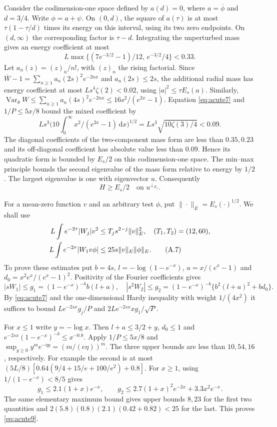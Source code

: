 \documentclass[11pt,a4paper,reqno]{amsart}
\theoremstyle{remark}
\numberwithin{equation}{section}
\newcommand{\dd}{\,\mathrm d}
\newcommand{\av}[1]{\overline{#1}}
\DeclareMathOperator{\Var}{Var}
\begin{document}
Consider the codimension-one space defined by $a(d)=0$, where
$a=\av\phi$ and $d=3/4$. Write $\phi=a+\psi$. On $(0,d)$, the square
of $a(\tau)$ is at most $\tau(1-\tau/d)$ times its energy on this interval,
using its two zero endpoints. On $(d,\infty)$ the corresponding factor
is $\tau-d$. Integrating the unperturbed mass gives an energy coefficient
at most
\[
 L\max\{(7e^{-3/2}-1)/12,\,e^{-3/2}/4\}<0.33 .
\]
Let $a_n(z)=(z)_n/n!$, with $(z)_n$ the rising factorial. Since
$\av W-1=\sum_{n\ge1}a_n(2s)^2 e^{-2nx}$ and $a_n(2s)\le2s$, the
additional radial mass has energy coefficient at most $Ls^4\zeta(2)<0.02$,
using $|a|^2\le\tau E_s(a)$. Similarly,
$\Var_\theta W\le\sum_{n\ge1}a_n(4s)^2 e^{-2nx}\le16s^2/(e^{2x}-1)$.
Equation \eqref{eq:acute7} and $1/P\le5x/8$ bound the mixed coefficient by
\[
 Ls^3\Big(10\int_0^\infty x^2/(e^{2x}-1)\dd x\Big)^{1/2}
 =Ls^3\sqrt{10\zeta(3)/4}<0.09.
\]
The diagonal coefficients of the two-component mass form are less than
$0.35,0.23$ and its off-diagonal coefficient has absolute value less than
$0.09$. Hence its quadratic form is bounded by $E_s/2$ on this
codimension-one space. The min--max principle bounds the second eigenvalue
of the mass form relative to energy by $1/2$. The largest eigenvalue is
one with eigenvector $u$. Consequently
\[
             H\ge E_s/2\quad\text{on }u^{\perp_{E_s}}.
 \tag{A.6}\label{eq:acute8}
\]

For a mean-zero function $v$ and an arbitrary test $\phi$, put
$\|\cdot\|_E=E_s(\cdot)^{1/2}$. We shall use
\begin{align}
 L\int e^{-2\tau}|W_j|v^2&\le T_j s^{2-j}\|v\|_E^2,
   \quad (T_1,T_2)=(12,60),\notag\\
 L\int e^{-2\tau}|W_1v\phi|&\le25s\|v\|_E\|\phi\|_E .
 \tag{A.7}\label{eq:acute9}
\end{align}
To prove these estimates put $b=4s$, $l=-\log(1-e^{-x})$,
$a=x/(e^x-1)$ and $d_0=x^2 e^x/(e^x-1)^2$. Positivity of the
Fourier coefficients gives
\[
 |sW_1|\le g_1=(1-e^{-x})^{-b}b(l+a),\quad
 |s^2W_2|\le g_2=(1-e^{-x})^{-b}\{b^2(l+a)^2+bd_0\}.
\]
By \eqref{eq:acute7} and the one-dimensional Hardy inequality with
weight $1/(4x^2)$ it suffices to bound $Le^{-2sx}g_j/P$ and
$2Le^{-2sx}xg_1/\sqrt P$.

For $x\le1$ write $y=-\log x$. Then $l+a\le3/2+y$, $d_0\le1$ and
$e^{-2sx}(1-e^{-x})^{-b}\le x^{-0.8}$. Apply $1/P\le5x/8$ and
$\sup_{y\ge0} y^m e^{-\eta y}=(m/(e\eta))^m$. The three upper bounds
are less than $10,54,16$, respectively. For example the second is at most
$(5L/8)[0.64(9/4+15/e+100/e^2)+0.8]$. For $x\ge1$, using
$1/(1-e^{-x})<8/5$ gives
\[
 g_1\le2.1(1+x)e^{-x},\qquad
 g_2\le2.7(1+x)^2e^{-2x}+3.3x^2e^{-x}.
\]
The same elementary maximum bound gives upper bounds $8,23$ for the
first two quantities and $2(5.8)(0.8)(2.1)(0.42+0.82)<25$ for the last.
This proves \eqref{eq:acute9}.
\end{document}
